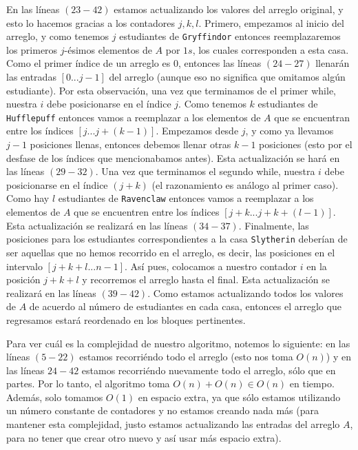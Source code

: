 \documentclass[letterpaper,11pt]{article}
\begin{document}
\begin{enumerate}
    En las líneas $(23 - 42)$ estamos actualizando los valores del arreglo 
    original, y esto lo hacemos gracias a los contadores $j, k, l$. Primero, 
    empezamos al inicio del arreglo, y como tenemos $j$ estudiantes de
    \texttt{Gryffindor} entonces reemplazaremos los primeros $j$-ésimos
    elementos de $A$ por $1s$, los cuales corresponden a esta casa. Como el 
    primer índice de un arreglo es $0$, entonces las líneas $(24 - 27)$
    llenarán las entradas $[0...j-1]$ del arreglo (aunque eso no significa 
    que omitamos algún estudiante). Por esta observación, una vez que 
    terminamos de el primer while, nuestra $i$ debe posicionarse en el índice 
    $j$. Como tenemos $k$ estudiantes de \texttt{Hufflepuff} entonces vamos a
    reemplazar a los elementos de $A$ que se encuentran entre los índices 
    $[j...j+(k-1)]$. Empezamos desde $j$, y como ya llevamos $j-1$ posiciones 
    llenas, entonces debemos llenar otras $k-1$ posiciones (esto por el desfase
    de los índices que mencionabamos antes). Esta actualización se hará en las 
    líneas $(29 - 32)$. Una vez que terminamos el segundo while, nuestra $i$
    debe posicionarse en el índice $(j + k)$ (el razonamiento es análogo al 
    primer caso). Como hay $l$ estudiantes de \texttt{Ravenclaw} entonces 
    vamos a reemplazar a los elementos de $A$ que se encuentren entre los 
    índices $[j+k...j+k+(l-1)]$. Esta actualización se realizará en las líneas 
    $(34 - 37)$. Finalmente, las posiciones para los estudiantes correspondientes 
    a la casa \texttt{Slytherin} deberían de ser aquellas que no hemos recorrido 
    en el arreglo, es decir, las posiciones en el intervalo $[j+k+l...n-1]$.
    Así pues, colocamos a nuestro contador $i$ en la posición $j + k + l$ y 
    recorremos el arreglo hasta el final. Esta actualización se realizará en 
    las líneas $(39 - 42)$. Como estamos actualizando todos los valores de 
    $A$ de acuerdo al número de estudiantes en cada casa, entonces el arreglo 
    que regresamos estará reordenado en los bloques pertinentes.

    Para ver cuál es la complejidad de nuestro algoritmo, notemos lo siguiente:
    en las líneas $(5 - 22)$ estamos recorriéndo todo el arreglo (esto nos 
    toma $O(n)$) y en las líneas $24 - 42$ estamos recorriéndo nuevamente todo 
    el arreglo, sólo que en partes. Por lo tanto, el algoritmo toma 
    $O(n) + O(n) \in O(n)$ en tiempo. Además, solo tomamos $O(1)$ en espacio extra, 
    ya que sólo estamos utilizando un número constante de contadores y no 
    estamos creando nada más (para mantener esta complejidad, justo estamos 
    actualizando las entradas del arreglo $A$, para no tener que crear otro 
    nuevo y así usar más espacio extra). 



\end{enumerate}
\end{document}
